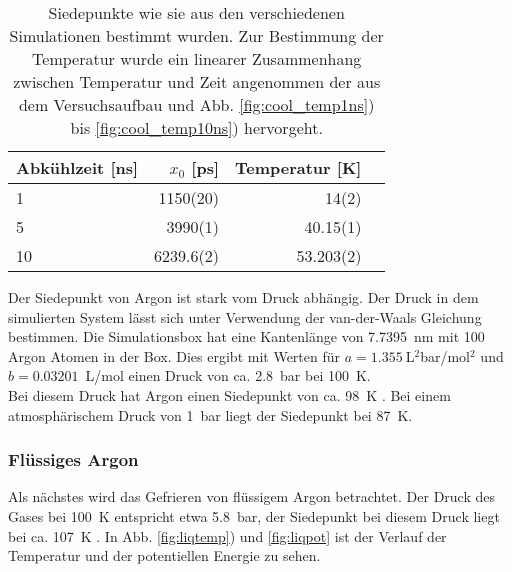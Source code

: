 \begin{table}
\centering
\caption{Siedepunkte wie sie aus den verschiedenen Simulationen bestimmt wurden. Zur Bestimmung der Temperatur wurde ein linearer Zusammenhang zwischen Temperatur und Zeit angenommen der aus dem Versuchsaufbau und Abb. \ref{fig:cool_temp1ns}) bis \ref{fig:cool_temp10ns}) hervorgeht.}\label{tab:siedepunkt}
\begin{tabular}{l|rrr}
Abkühlzeit [ns] & $x_0$ [ps] & Temperatur [K] \\ \hline
1 & 1150(20) &  14(2) \\
5 & 3990(1) & 40.15(1) \\
10 & 6239.6(2) & 53.203(2) \\
\end{tabular}
\end{table}

Der Siedepunkt von Argon ist stark vom Druck abhängig. Der Druck in dem simulierten System lässt sich unter Verwendung der van-der-Waals Gleichung bestimmen. Die Simulationsbox hat eine Kantenlänge von 7.7395~nm mit 100 Argon Atomen in der Box.
Dies ergibt mit Werten für $a = 1.355~$L$^2$bar/mol$^2$ und $b=0.03201$~L/mol \cite{chemicalcrc} einen Druck von ca. 2.8~bar bei 100~K.
\\ \noindent
Bei diesem Druck hat Argon einen Siedepunkt von ca. 98~K \cite{phasediagram}. Bei einem atmosphärischem Druck von 1~bar liegt der Siedepunkt bei 87~K.


%
\subsubsection{Flüssiges Argon}
%
Als nächstes wird das Gefrieren von flüssigem Argon betrachtet. Der Druck des Gases bei 100~K entspricht etwa 5.8~bar, der Siedepunkt bei diesem Druck liegt bei ca. 107~K \cite{phasediagram}.
In Abb. \ref{fig:liqtemp}) und \ref{fig:liqpot} ist der Verlauf der Temperatur und der potentiellen Energie zu sehen.

